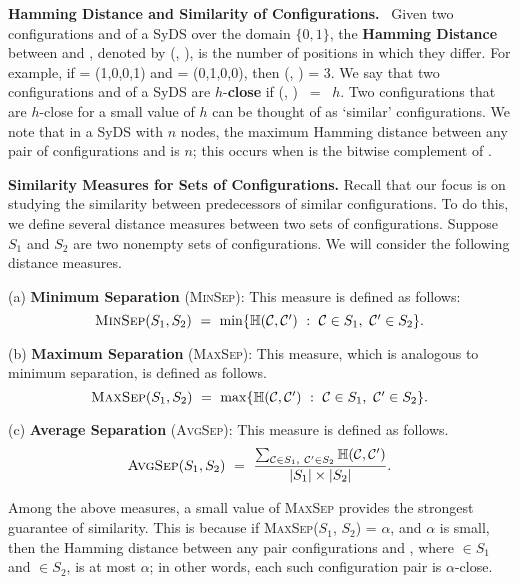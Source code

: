 \smallskip

\noindent
\textbf{Hamming Distance and Similarity of Configurations.}~
Given two configurations \calcone{} and \calctwo{} of a SyDS
over the domain $\{0,1\}$,
the \textbf{Hamming Distance} between \calcone{} and \calctwo, 
denoted by \calh(\calcone, \calctwo), is
the number of positions in which they differ.
For example, if
\calcone{} = (1,0,0,1) and \calctwo{} = (0,1,0,0),   
then \calh(\calcone, \calctwo) = 3.  
We say that two configurations \calcone{} and \calctwo{} 
of a SyDS are $h$-\textbf{close} if \calh(\calco, \calct) ~=~ $h$. 
Two configurations that are $h$-close for a small value of $h$
can be thought of as `similar' configurations.  
We note that in a SyDS with $n$ nodes, 
the maximum Hamming distance between any pair of configurations
\calcone{} and \calctwo{} is $n$; this occurs when \calcone{}
is the bitwise complement of \calctwo. 

\smallskip

\noindent
\textbf{Similarity Measures for Sets of Configurations.} Recall
that our focus is on studying the similarity between predecessors
of similar configurations.
To do this, we define several distance measures between two sets of
configurations.
Suppose $S_1$ and $S_2$ are two nonempty sets of configurations.
We will consider the following distance measures.

\newcommand{\minsep}{\mbox{\textsc{MinSep}}}
\newcommand{\maxsep}{\mbox{\textsc{MaxSep}}}
\newcommand{\avgsep}{\mbox{\textsc{AvgSep}}}

\begin{description}
\item{(a)} \textbf{Minimum Separation} (\minsep): This measure is defined as follows:
\[ 
\minsep(S_1, S_2) ~=~ \min\{ \calh(\calc, \calcp) ~:~ 
                                \calc{} \in S_1,~ \calcp{} \in S_2\}.
\]
\item{(b)} \textbf{Maximum Separation} (\maxsep): This measure, which is
analogous to minimum separation, is defined as follows.
\[ 
\maxsep(S_1, S_2) ~=~ \max\{ \calh(\calc, \calcp) ~:~ 
                                \calc{} \in S_1,~ \calcp{} \in S_2\}.
\]
\item{(c)} \textbf{Average Separation} (\avgsep): This measure is defined as follows.
\[ 
\avgsep(S_1, S_2) ~=~ \displaystyle{\frac{\sum_{\mathcal{C} \in S_1,~ \mathcal{C}' \in S_2}
                            \calh(\calc, \calcp)}{|S_1| \times |S_2|}}.
\]
\end{description}
Among the above measures, a small value of \maxsep{} provides the 
strongest guarantee of similarity.
This is because if \maxsep($S_1$, $S_2$) = $\alpha$, and $\alpha$ is small,
then the Hamming distance
between any pair configurations \calc{} and \calcp, where \calc{} $\in S_1$
and \calcp{} $\in S_2$, is at most $\alpha$; in other words, 
each such configuration pair is $\alpha$-close.

